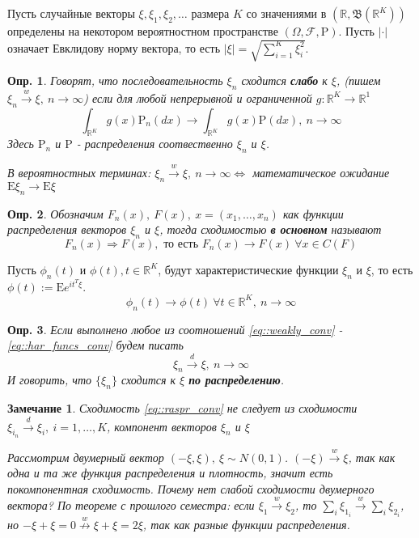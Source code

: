 \documentclass[12pt]{article}
\newtheorem{definition}{Опр.}
\newtheorem*{remark}{Замечание}
\theoremstyle{basic_theorem}
\theoremstyle{name_theorem}
\newcommand\defin[1]{\textbf{#1}}
\def\R{
    \mathbb{R}
}
\def\E{
    \mathrm{E}
}
\def\P{
    \mathrm{P}
}
\def\F{
    \mathcal{F}
}
\def\B{
    \mathfrak{B}
}
\begin{document}
Пусть случайные векторы $\xi, \xi_1, \xi_2, \ldots$ размера $K$ со значениями
в $(\R, \B(\R^K))$ определены на некотором вероятностном пространстве $(\Omega, \F, \P)$.
Пусть $|\cdot|$ означает Евклидову норму вектора, то есть $|\xi| = \sqrt{\sum_{i=1}^K\xi_i^2}$.
\begin{definition}
    Говорят, что последовательность ${\xi_n}$ сходится \defin{слабо} к $\xi$,
    (пишем $\xi_n \xrightarrow{w} \xi,\ n \rightarrow \infty$) если
    для любой непрерывной и ограниченной $g: \R^K \rightarrow \R^1 $
    \begin{equation} \label{eq::weakly_conv}
        \int_{\R^K}g(x)\P_{n}(dx) \rightarrow \int_{\R^K}g(x) \P(dx) ,\ n \rightarrow \infty  
    \end{equation}
    Здесь $\P_n$ и $\P$ - распределения соотвественно $\xi_n$ и $\xi$.
    
    В вероятностных терминах: $\xi_n \xrightarrow{w} \xi,\ n \rightarrow \infty \Leftrightarrow$
    математическое ожидание $\E\xi_n \rightarrow \E\xi$
\end{definition}
\begin{definition}
    Обозначим $F_n(x),\ F(x),\ x=(x_1, \ldots, x_n)$ как функции распределения
    векторов $\xi_n$  и $\xi$, тогда сходимостью \defin{в основном} называют
    \begin{equation} \label{eq::mainly_conv}
        F_n(x) \Rightarrow F(x), \text{ то есть } F_n(x)\rightarrow F(x)\ \forall x\in C(F)
    \end{equation}
\end{definition}

    Пусть $\phi_n(t)$ и $\phi(t), t\in\R^K$, будут характеристические функции
    $\xi_n$ и $\xi$, то есть $\phi(t):=\E e^{it^T\xi}$.
    \begin{equation} \label{eq::har_funcs_conv}
        \phi_n(t) \rightarrow \phi(t)\ \forall t\in\R^K,\ n\rightarrow\infty 
    \end{equation}
\begin{definition}
    Если выполнено любое из соотношений \eqref{eq::weakly_conv} - \eqref{eq::har_funcs_conv}
    будем писать
    \begin{equation}\label{eq::raspr_conv}
        \xi_n\xrightarrow{d}\xi,\ n\rightarrow\infty
    \end{equation}
    И говорить, что $\{\xi_n\}$ сходится к $\xi$ \defin{по распределению}.
\end{definition}
\begin{remark}
    Сходимость \eqref{eq::raspr_conv} не следует из сходимости
    $\xi_{i_n}\xrightarrow{d}\xi_i,\ i=1,\ldots,K$, компонент векторов $\xi_n$ и $\xi$

    Рассмотрим двумерный вектор $(-\xi, \xi),\ \xi \sim N(0,1)$.
    $(-\xi) \xrightarrow{w} \xi$, так как одна и та же функция распределения и плотность,
    значит есть покомпонентная сходимость. Почему нет слабой сходимости двумерного вектора?
    По теореме с прошлого семестра: если $\xi_1 \xrightarrow{w}\xi_2$, то
    $\sum_i\xi_{1_i} \xrightarrow{w} \sum_i\xi_{2_i}$, но $-\xi+\xi=0 \overset{w}{\nrightarrow} \xi+\xi=2\xi$,
    так как разные функции распределения.
\end{remark}
\end{document}
